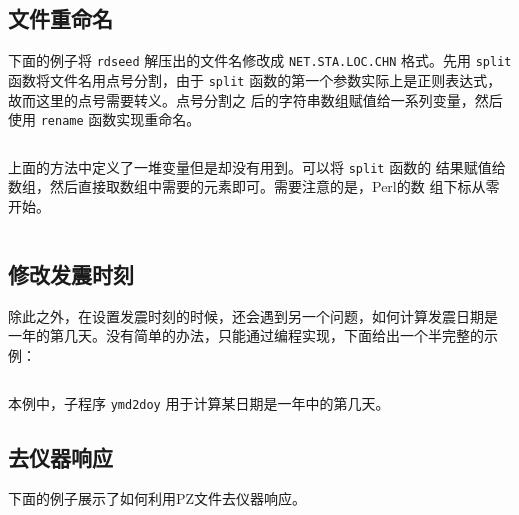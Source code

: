 \subsection{文件重命名}
\label{subsec:rename-in-perl}
下面的例子将 \texttt{rdseed} 解压出的文件名修改成 \texttt{NET.STA.LOC.CHN}
格式。先用 \texttt{split} 函数将文件名用点号分割，由于 \texttt{split}
函数的第一个参数实际上是正则表达式，故而这里的点号需要转义。点号分割之
后的字符串数组赋值给一系列变量，然后使用 \texttt{rename} 函数实现重命名。
\inputminted{perl}{./call-in-script/rename1.pl}

上面的方法中定义了一堆变量但是却没有用到。可以将 \texttt{split} 函数的
结果赋值给数组，然后直接取数组中需要的元素即可。需要注意的是，Perl的数
组下标从零开始。
\inputminted{perl}{./call-in-script/rename2.pl}

\subsection{修改发震时刻}
\label{subsec:ch-origin-perl}
除此之外，在设置发震时刻的时候，还会遇到另一个问题，如何计算发震日期是
一年的第几天。没有简单的办法，只能通过编程实现，下面给出一个半完整的示例：
\inputminted{perl}{./call-in-script/ch-origin.pl}
本例中，子程序 \texttt{ymd2doy} 用于计算某日期是一年中的第几天。

\subsection{去仪器响应}
下面的例子展示了如何利用PZ文件去仪器响应。
\inputminted{perl}{./call-in-script/transfer.pl}
